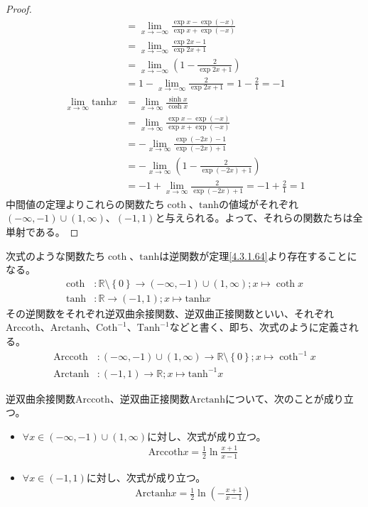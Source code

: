\documentclass[dvipdfmx]{jsarticle}
\begin{document}
\begin{proof}
\begin{align*}
&= \lim_{x \rightarrow - \infty}\frac{\exp x - \exp( - x)}{\exp x + \exp( - x)}\\
&= \lim_{x \rightarrow - \infty}\frac{\exp{2x} - 1}{\exp{2x} + 1}\\
&= \lim_{x \rightarrow - \infty}\left( 1 - \frac{2}{\exp{2x} + 1} \right)\\
&= 1 - \lim_{x \rightarrow - \infty}\frac{2}{\exp{2x} + 1} = 1 - \frac{2}{1} = - 1\\
\lim_{x \rightarrow \infty}{\mathrm{tanh} x} &= \lim_{x \rightarrow \infty}\frac{\sinh x}{\cosh x}\\
&= \lim_{x \rightarrow \infty}\frac{\exp x - \exp( - x)}{\exp x + \exp( - x)}\\
&= - \lim_{x \rightarrow \infty}\frac{\exp( - 2x) - 1}{\exp( - 2x) + 1}\\
&= - \lim_{x \rightarrow \infty}\left( 1 - \frac{2}{\exp( - 2x) + 1} \right)\\
&= - 1 + \lim_{x \rightarrow \infty}\frac{2}{\exp( - 2x) + 1} = - 1 + \frac{2}{1} = 1
\end{align*}
中間値の定理よりこれらの関数たち$\coth$、$\mathrm{tanh}$の値域がそれぞれ$( - \infty, - 1) \cup (1,\infty)$、$( - 1,1)$と与えられる。よって、それらの関数たちは全単射である。
\end{proof}
\begin{dfn}
次式のような関数たち$\coth$、$\mathrm{tanh}$は逆関数が定理\ref{4.3.1.64}より存在することになる。
\begin{align*}
\coth&:\mathbb{R} \setminus \left\{ 0 \right\} \rightarrow ( - \infty, - 1) \cup (1,\infty);x \mapsto \coth x\\
\mathrm{tanh}&:\mathbb{R} \rightarrow ( - 1,1);x \mapsto \mathrm{tanh} x
\end{align*}
その逆関数をそれぞれ逆双曲余接関数、逆双曲正接関数といい、それぞれ$\mathrm{Arccoth}$、$\mathrm{Arctanh}$、${\mathrm{Coth}}^{- 1}$、${\mathrm{Tanh}}^{- 1}$などと書く、即ち、次式のように定義される。
\begin{align*}
\mathrm{Arccoth}&:( - \infty, - 1) \cup (1,\infty) \rightarrow \mathbb{R} \setminus \left\{ 0 \right\};x \mapsto \coth^{- 1}x\\
\mathrm{Arctanh}&:( - 1,1) \rightarrow \mathbb{R};x \mapsto \mathrm{tanh}^{- 1}x
\end{align*}
\end{dfn}
\begin{thm}\label{4.3.1.65}
逆双曲余接関数$\mathrm{Arccoth}$、逆双曲正接関数$\mathrm{Arctanh}$について、次のことが成り立つ。
\begin{itemize}
\item
  $\forall x \in ( - \infty, - 1) \cup (1,\infty)$に対し、次式が成り立つ。
\begin{align*}
{\mathrm{Arccoth}}x = \frac{1}{2}\ln\frac{x + 1}{x - 1}
\end{align*}
\item
  $\forall x \in ( - 1,1)$に対し、次式が成り立つ。
\begin{align*}
{\mathrm{Arctanh}}x = \frac{1}{2}\ln\left( - \frac{x + 1}{x - 1} \right)
\end{align*}
\end{itemize}
\end{thm}
\end{document}
